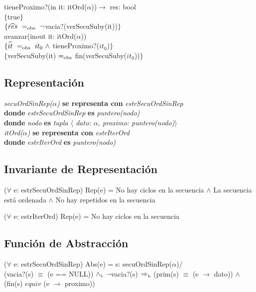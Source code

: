 tieneProximo?(in it: itOrd($\alpha$))$\longrightarrow$ res: bool\\
$\{$true$\}$\\
$\{\widehat{res}\ \igobs\ \neg$vacia?(verSecuSuby(it))$\}$\\

avanzar(inout it: itOrd($\alpha$))\\
$\{\widehat{it}\ =_{\mathrm{obs}}\ it_0\ \wedge$ tieneProximo?($it_0$)$\}$\\
$\{$verSecuSuby(it) $=_{\mathrm{obs}}$ fin(verSecuSuby($it_0$))$\}$\\


\subsection*{Representaci\'on}
\textit{secuOrdSinRep($\alpha$)} \textbf{se representa con} \textit{estrSecuOrdSinRep}\\
\textbf{donde} \textit{estrSecuOrdSinRep} \textbf{es} \textit{puntero(nodo)}\\
\textbf{donde} \textit{nodo} \textbf{es} \textit{tupla $\langle$ dato: $\alpha$, proximo: puntero(nodo)$\rangle$}\\

\textit{itOrd($\alpha$)} \textbf{se representa con} \textit{estrIterOrd}\\
\textbf{donde} \textit{estrIterOrd} \textbf{es} \textit{puntero(nodo)}\\

\subsection*{Invariante de Representaci\'on}
\vspace{11pt}
($\forall$ e: estrSecuOrdSinRep) Rep(e) = No hay ciclos en la secuencia $\wedge$ La secuencia est\'a ordenada $\wedge$ No hay repetidos en la secuencia

\vspace{22pt}

\vspace{11pt}
($\forall$ e: estrIterOrd) Rep(e) = No hay ciclos en la secuencia

\vspace{33pt}

\subsection*{Funci\'on de Abstracci\'on}
\vspace{11pt}
($\forall$ e: estrSecuOrdSinRep) Abs(e) = s: secuOrdSinRep($\alpha$)/\\
(vacia?(s) $\equiv$ (e == NULL)) $\land_{\mathrm{\scriptscriptstyle{L}}}$ $\neg$vacia?(s) $\Rightarrow_{\mathrm{\scriptscriptstyle{L}}}$ (prim(s) $\equiv$ (e $\rightarrow$ dato)) $\wedge$ (fin(s) $equiv$ (e $\rightarrow$ proximo))

